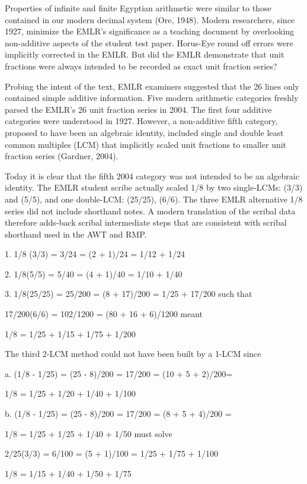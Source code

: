 \documentclass[12pt]{article}
\begin{document}
 
Properties of infinite and finite Egyptian arithmetic were similar to those contained in our modern decimal system (Ore, 1948). Modern researchers, since 1927, minimize the EMLR's significance as a teaching document by overlooking non-additive aspects of the student test paper. Horus-Eye round off errors were implicitly corrected in the EMLR. But did the EMLR demonstrate that unit fractions were always intended to be recorded as exact unit fraction series?

Probing the intent of the text, EMLR examiners suggested that the 26 lines only contained simple additive information.  Five modern arithmetic categories freshly parsed the EMLR's 26 unit fraction series in 2004.  The first four additive categories were understood in 1927. However, a non-additive fifth category, proposed to have been an algebraic identity, included single and double least common multiples (LCM) that implicitly scaled unit fractions to smaller unit fraction series (Gardner, 2004).

Today it is clear that the fifth 2004 category was not intended to be an algebraic identity. The EMLR student scribe actually scaled 1/8 by two single-LCMs: (3/3) and (5/5), and one double-LCM: (25/25), (6/6). The three EMLR alternative 1/8 series did not include shorthand notes. A modern translation of the scribal data therefore adds-back scribal intermediate steps that are consistent with scribal shorthand used in the AWT and RMP.

1.  1/8 (3/3) = 3/24 = (2 + 1)/24 = 1/12 + 1/24

2.	1/8(5/5) = 5/40 = (4 + 1)/40 = 1/10 + 1/40

3.	1/8(25/25) = 25/200 = (8 + 17)/200 = 1/25 + 17/200 such that

17/200(6/6) = 102/1200 = (80 + 16 + 6)/1200  meant

 1/8 = 1/25 + 1/15 + 1/75 + 1/200 
 
The third 2-LCM method could not have been built by a 1-LCM since

a. (1/8 - 1/25) = (25 - 8)/200 = 17/200 = (10 + 5 + 2)/200= 

1/8 = 1/25 + 1/20 + 1/40 + 1/100

b. (1/8 - 1/25) = (25 - 8)/200 = 17/200 = (8 + 5 + 4)/200 =

1/8 = 1/25 + 1/25 + 1/40 + 1/50 must solve 

2/25(3/3) = 6/100 = (5 + 1)/100 = 1/25 + 1/75 + 1/100

1/8 = 1/15 + 1/40 + 1/50 + 1/75 
\end{document}
